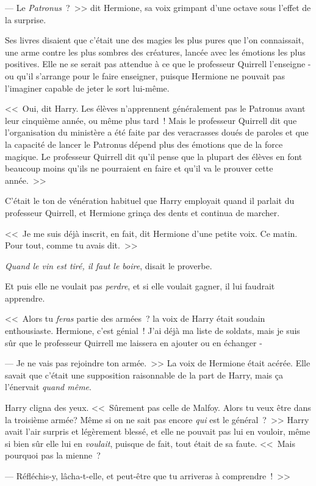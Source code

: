 --- Le \emph{Patronus}~?~>> dit Hermione, sa voix grimpant d'une octave sous l'effet de la surprise.

Ses livres disaient que c'était une des magies les plus pures que l'on connaissait, une arme contre les plus sombres des créatures, lancée avec les émotions les plus positives. Elle ne se serait pas attendue à ce que le professeur Quirrell l'enseigne - ou qu'il s'arrange pour le faire enseigner, puisque Hermione ne pouvait pas l'imaginer capable de jeter le sort lui-même.

<<~Oui, dit Harry. Les élèves n'apprennent généralement pas le Patronus avant leur cinquième année, ou même plus tard~! Mais le professeur Quirrell dit que l'organisation du ministère a été faite par des veracrasses doués de paroles et que la capacité de lancer le Patronus dépend plus des émotions que de la force magique. Le professeur Quirrell dit qu'il pense que la plupart des élèves en font beaucoup moins qu'ils ne pourraient en faire et qu'il va le prouver cette année.~>>

C'était le ton de vénération habituel que Harry employait quand il parlait du professeur Quirrell, et Hermione grinça des dents et continua de marcher.

<<~Je me suis déjà inscrit, en fait, dit Hermione d'une petite voix. Ce matin. Pour tout, comme tu avais dit.~>>

\emph{Quand le vin est tiré, il faut le boire}, disait le proverbe.

Et puis elle ne voulait pas \emph{perdre}, et si elle voulait gagner, il lui faudrait apprendre.

<<~Alors tu \emph{feras} partie des armées~? la voix de Harry était soudain enthousiaste. Hermione, c'est génial~! J'ai déjà ma liste de soldats, mais je suis sûr que le professeur Quirrell me laissera en ajouter ou en échanger -

--- Je ne vais pas rejoindre ton armée.~>> La voix de Hermione était acérée. Elle savait que c'était une supposition raisonnable de la part de Harry, mais ça l'énervait \emph{quand même}.

Harry cligna des yeux. <<~Sûrement pas celle de Malfoy. Alors tu veux être dans la troisième armée? Même si on ne sait pas encore \emph{qui} est le général~?~>> Harry avait l'air surpris et légèrement blessé, et elle ne pouvait pas lui en vouloir, même si bien sûr elle lui en \emph{voulait}, puisque de fait, tout était de sa faute. <<~Mais pourquoi pas la mienne~?

--- Réfléchis-y, lâcha-t-elle, et peut-être que tu arriveras à comprendre~!~>>

